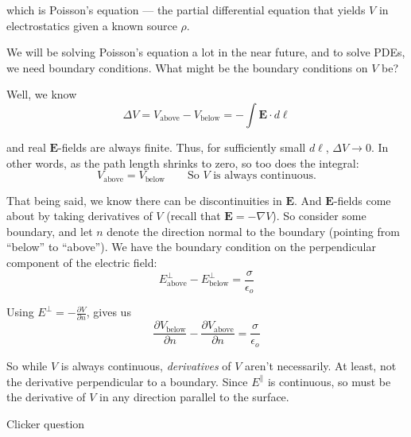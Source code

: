 \documentclass{article}
\begin{document}
which is Poisson's equation --- the partial differential equation that yields $V$ in electrostatics given a known source $\rho$.

\vspace{1em}

We will be solving Poisson's equation a lot in the near future, and to solve PDEs, we need boundary conditions. What might be the boundary conditions on $V$ be?

\vspace{1em}

Well, we know
\begin{equation*}
    \Delta V = V_{\text{above}} - V_{\text{below}} = -\int \bm{E} \cdot d\bm{\ell}
\end{equation*}

and real $\bm{E}$-fields are always finite. Thus, for sufficiently small $d\bm{\ell}$, $\displaystyle \Delta V \to 0$. In other words, as the path length shrinks to zero, so too does the integral:
\begin{equation*}
    V_{\text{above}} = V_{\text{below}} \qquad \boxed{\text{So } V \text{ is always continuous.}}
\end{equation*}

That being said, we know there can be discontinuities in $\bm{E}$. And $\bm{E}$-fields come about by taking derivatives of $V$ (recall that $\bm{E} = -\nabla V$). So consider some boundary, and let $n$ denote the direction normal to the boundary (pointing from ``below'' to ``above''). We have the boundary condition on the perpendicular component of the electric field:
\begin{equation*}
    E_{\text{above}}^{\perp} - E_{\text{below}}^{\perp} = \frac{\sigma}{\epsilon_o}
\end{equation*}

Using $\displaystyle E^{\perp} = -\frac{\partial V}{\partial n}$, gives us
\begin{equation*}
    \boxed{\frac{\partial V_{\text{below}}}{\partial n} - \frac{\partial V_{\text{above}}}{\partial n} = \frac{\sigma}{\epsilon_o}}
\end{equation*}

So while $V$ is always continuous, \emph{derivatives} of $V$ aren't necessarily. At least, not the derivative perpendicular to a boundary. Since $E^{\parallel}$ is continuous, so must be the derivative of $V$ in any direction parallel to the surface.

\begin{mdframed}[backgroundcolor=black!4, align=center, userdefinedwidth=0.8\textwidth, topline=false, bottomline = false, leftline = false, rightline = false, frametitle = {Interlude}]
\begin{center}
\iclicker[scale=0.28]Clicker question
\end{center}
\end{mdframed}
\end{document}
